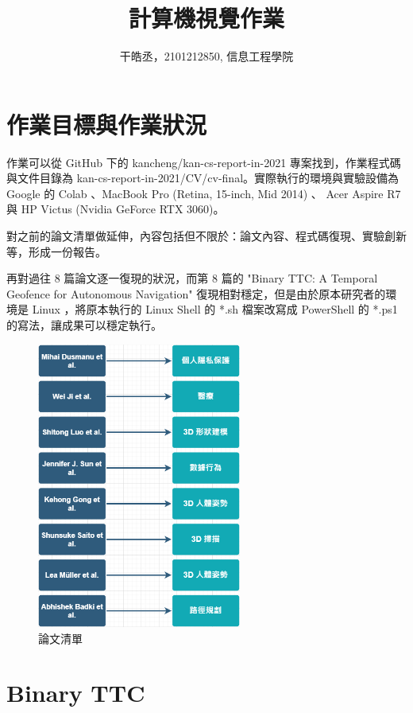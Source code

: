 \documentclass[10pt,UTF8]{ctexart}
\title{計算機視覺作業}
\author{干皓丞，2101212850, 信息工程學院}
\begin{document}
\maketitle


\section{作業目標與作業狀況}

作業可以從 GitHub 下的 kancheng/kan-cs-report-in-2021 專案找到，作業程式碼與文件目錄為 kan-cs-report-in-2021/CV/cv-final。實際執行的環境與實驗設備為 Google 的 Colab 、MacBook Pro (Retina, 15-inch, Mid 2014) 、 Acer Aspire R7 與 HP Victus (Nvidia GeForce RTX 3060)。

對之前的論文清單做延伸，內容包括但不限於：論文內容、程式碼復現、實驗創新等，形成一份報告。

再對過往 8 篇論文逐一復現的狀況，而第 8 篇的 "Binary TTC: A Temporal Geofence for Autonomous Navigation" 復現相對穩定，但是由於原本研究者的環境是 Linux ，將原本執行的 Linux Shell 的 *.sh 檔案改寫成 PowerShell 的 *.ps1 的寫法，讓成果可以穩定執行。

\begin{figure}[H]
\centering 
\includegraphics[width=0.60\textwidth]{m1.png} 
\caption{論文清單}
\label{Test}
\end{figure}

\section{Binary TTC}
\end{document}
